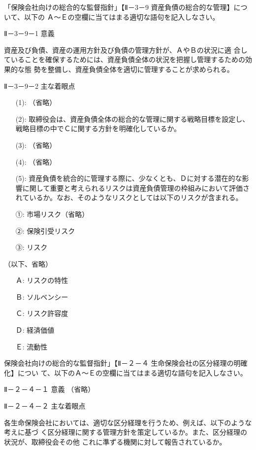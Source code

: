 \documentclass[report,gutter=10mm,fore-edge=10mm,uplatex,dvipdfmx]{jlreq}
\begin{document}

「保険会社向けの総合的な監督指針」【Ⅱ－3－9 資産負債の総合的な管理】について、以下の
Ａ～Ｅの空欄に当てはまる適切な語句を記入しなさい。

Ⅱ－3－9－1 意義

資産及び負債、資産の運用方針及び負債の管理方針が、ＡやＢの状況に適
合していることを確保するためには、資産負債全体の状況を把握し管理するための効果的な態
勢を整備し、資産負債全体を適切に管理することが求められる。

Ⅱ－3－9－2 主な着眼点

\begin{itemize}
 \item[(1): ]  （省略）
 \item[(2): ]  取締役会は、資産負債全体の総合的な管理に関する戦略目標を設定し、戦略目標の中でＣに関する方針を明確化しているか。
 \item[(3): ]  （省略）
 \item[(4): ]  （省略）
 \item[(5): ]  資産負債を統合的に管理する際に、少なくとも、Ｄに対する潜在的な影響に関して重要と考えられるリスクは資産負債管理の枠組みにおいて評価されているか。なお、そのようなリスクとしては以下のリスクが含まれる。
 \item[①: ] 市場リスク（省略）
 \item[②: ] 保険引受リスク
 \item[③: ] リスク
\end{itemize}

（以下、省略）
\answer{}
\begin{itemize}
\item[ Ａ: ] リスクの特性
\item[ Ｂ: ] ソルベンシー
\item[ Ｃ: ] リスク許容度
\item[ Ｄ: ] 経済価値
\item[ Ｅ: ] 流動性
\end{itemize}
保険会社向けの総合的な監督指針」【Ⅱ－２－４ 生命保険会社の区分経理の明確化】につい
て、以下のＡ～Ｅの空欄に当てはまる適切な語句を記入しなさい。

Ⅱ－２－４－１ 意義 （省略）

Ⅱ－２－４－２ 主な着眼点

各生命保険会社においては、適切な区分経理を行うため、例えば、以下のような考えに基づ
く区分経理に関する管理方針を策定しているか。また、区分経理の状況が、取締役会その他
これに準ずる機関に対して報告されているか。
\end{document}
